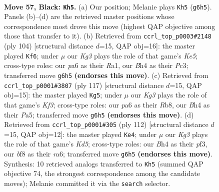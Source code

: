 \documentclass[11pt]{article}
\begin{document}
\clearpage

\begin{figure}[p]\centering
\begin{subfigure}{0.46\textwidth}\centering
\resizebox{\linewidth}{!}{%
\newchessgame
\chessboard[
  setfen={5B2/8/P5k1/1P6/3K1R1b/8/8/8 b - - 4 57},
  showmover=false,
  pgfstyle=straightmove, color=movearrow, markmove={g6-h5}
]}
\caption{}
\end{subfigure}\hfill
\begin{subfigure}{0.46\textwidth}\centering
\resizebox{\linewidth}{!}{%
\newchessgame
\chessboard[
  setfen={8/3k4/6p1/4K3/8/2Pr4/8/R7 w - - 8 53},
  showmover=false,
  pgfstyle=straightmove, color=movearrow, markmove={e5-f6}
]}
\caption{}
\end{subfigure}
\\[4pt]
\begin{subfigure}{0.46\textwidth}\centering
\resizebox{\linewidth}{!}{%
\newchessgame
\chessboard[
  setfen={1r6/8/5k2/p6P/R5P1/8/K7/8 b - - 3 59},
  showmover=false,
  pgfstyle=straightmove, color=movearrow, markmove={f6-g5}
]}
\caption{}
\end{subfigure}\hfill
\begin{subfigure}{0.46\textwidth}\centering
\resizebox{\linewidth}{!}{%
\newchessgame
\chessboard[
  setfen={8/4B3/r5k1/3K4/6p1/5p2/5R2/8 w - - 0 57},
  showmover=false,
  pgfstyle=straightmove, color=movearrow, markmove={d5-e4}
]}
\caption{}
\end{subfigure}
\caption{\textbf{Move 57, Black: \texttt{Kh5}.} (a) Our position; Melanie plays \texttt{Kh5} (\texttt{g6h5}). Panels (b)--(d) are the retrieved master positions whose correspondence most drove this move (highest QAP objective among those that transfer to it). (b) Retrieved from \texttt{ccrl\_top\_p0003\#2148} (ply 104) [structural distance $d$=15, QAP obj=16]: the master played \texttt{Kf6}; under $\mu$ our \emph{Kg3} plays the role of that game's \emph{Ke5}; cross-type roles: our \emph{p}a6 as their \emph{R}a1, our \emph{B}h4 as their \emph{P}c3; transferred move \texttt{g6h5} \textbf{(endorses this move)}. (c) Retrieved from \texttt{ccrl\_top\_p0001\#3807} (ply 117) [structural distance $d$=15, QAP obj=15]: the master played \texttt{Kg5}; under $\mu$ our \emph{Kg3} plays the role of that game's \emph{Kf3}; cross-type roles: our \emph{p}a6 as their \emph{R}b8, our \emph{B}h4 as their \emph{P}a5; transferred move \texttt{g6h5} \textbf{(endorses this move)}. (d) Retrieved from \texttt{ccrl\_top\_p0001\#305} (ply 112) [structural distance $d$=15, QAP obj=12]: the master played \texttt{Ke4}; under $\mu$ our \emph{Kg3} plays the role of that game's \emph{Kd5}; cross-type roles: our \emph{B}h4 as their \emph{p}f3, our \emph{b}f8 as their \emph{r}a6; transferred move \texttt{g6h5} \textbf{(endorses this move)}. Synthesis: 10 retrieved analogs transferred to \texttt{Kh5} (summed QAP objective 74, the strongest correspondence among the candidate moves); Melanie committed it via the \texttt{search} selector.}
\label{fig:thought-m113}
\end{figure}
\end{document}
